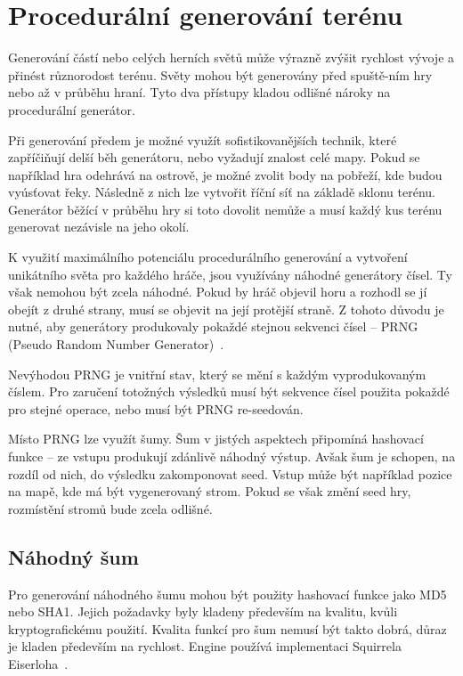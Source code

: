 \documentclass[thesis=M,czech]{FITthesis}[2019/12/23]
\begin{document}

\chapter{Procedurální generování terénu}

Generování částí nebo celých herních světů může výrazně zvýšit rychlost vývoje a přinést různorodost terénu. Světy mohou být generovány před spuště-ním hry nebo až v průběhu hraní. Tyto dva přístupy kladou odlišné nároky na procedurální generátor.

Při generování předem je možné využít sofistikovanějších technik, které zapříčiňují delší běh generátoru, nebo vyžadují znalost celé mapy. Pokud se například hra odehrává na ostrově, je možné zvolit body na pobřeží, kde budou vyúsťovat řeky. Následně z nich lze vytvořit říční síť na základě sklonu terénu. Generátor běžící v průběhu hry si toto dovolit nemůže a musí každý kus terénu generovat nezávisle na jeho okolí.

K využití maximálního potenciálu procedurálního generování a vytvoření unikátního světa pro každého hráče, jsou využívány náhodné generátory čísel. Ty však nemohou být zcela náhodné. Pokud by hráč objevil horu a rozhodl se jí obejít z druhé strany, musí se objevit na její protější straně. Z tohoto důvodu je nutné, aby generátory produkovaly pokaždé stejnou sekvenci čísel – PRNG (Pseudo Random Number Generator)~\cite{prng}.

Nevýhodou PRNG je vnitřní stav, který se mění s každým vyprodukovaným číslem. Pro zaručení totožných výsledků musí být sekvence čísel použita pokaždé pro stejné operace, nebo musí být PRNG re-seedován.

Místo PRNG lze využít šumy. Šum v jistých aspektech připomíná hashovací funkce -- ze vstupu produkují zdánlivě náhodný výstup. Avšak šum je schopen, na rozdíl od nich, do výsledku zakomponovat seed. Vstup může být například pozice na mapě, kde má být vygenerovaný strom. Pokud se však změní seed hry, rozmístění stromů bude zcela odlišné.

\section{Náhodný šum}

Pro generování náhodného šumu mohou být použity hashovací funkce jako MD5 nebo SHA1. Jejich požadavky byly kladeny především na kvalitu, kvůli kryptografickému použití. Kvalita funkcí pro šum nemusí být takto dobrá, důraz je kladen především na rychlost. Engine používá implementaci Squirrela Eiserloha~\cite{sqr_noise}.
\end{document}
